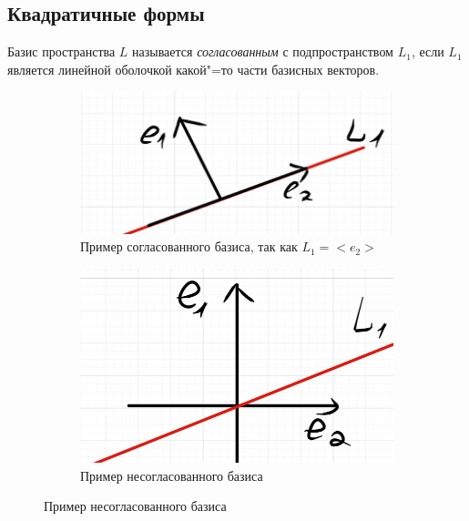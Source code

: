 \subsection*{Квадратичные формы}
\begin{definition}
  Базис пространства $L$ называется \textit{согласованным} с подпространством $L_1$, если $L_1$ является линейной оболочкой какой"=то части базисных векторов.
\end{definition}
\begin{example}
\begin{figure}[H]
  \centering
  \begin{subfigure}[b]{0.4\textwidth}
    \centering
    \includegraphics[width = \textwidth]{images/map_form_soglBasis.png}
    \caption{Пример согласованного базиса, так как $L_1 = <\!e_2\!>$}
  \end{subfigure}
  \hfill
  \begin{subfigure}[b]{0.4\textwidth}
    \centering
    \includegraphics[width = \textwidth]{images/map_form_NesoglBasis.png}
    \caption{Пример несогласованного базиса}
  \end{subfigure}
\end{figure}
\end{example}

